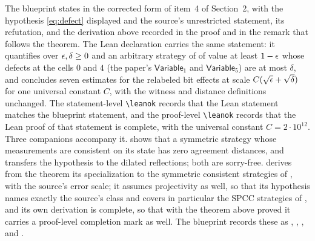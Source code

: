 \documentclass[11pt]{article}
\newcommand{\Variable}{\mathsf{Variable}}
\begin{document}
The blueprint \cite{MIPStarREBlueprint} states  in the
corrected form of item~4 of Section~2, with the hypothesis \eqref{eq:defect}
displayed and the source's unrestricted statement, its refutation, and the
derivation above recorded in the proof and in the remark that follows the
theorem.  The Lean declaration 
carries the same statement: it quantifies over $\epsilon, \delta \ge 0$ and an
arbitrary strategy of  of value at least
$1-\epsilon$ whose defects  at
the cells $0$ and $4$ (the paper's $\Variable_1$ and $\Variable_5$) are at most
$\delta$, and concludes seven estimates for the relabeled bit effects at scale
$C(\sqrt{\epsilon} + \sqrt\delta)$ for one universal constant $C$, with the witness
and distance definitions unchanged.  The statement-level \verb|\leanok| records
that the Lean statement matches the blueprint statement, and the proof-level
\verb|\leanok| records that the Lean proof of that statement is complete, with
the universal constant $C = 2 \cdot 10^{12}$.  Three companions accompany it.
shows that a symmetric strategy whose measurements are consistent on its state
has zero agreement distances, and
transfers the hypothesis to the dilated reflections; both are sorry-free.
 derives
from the theorem its specialization to the symmetric consistent strategies of
, with the source's error scale; it
assumes projectivity as well, so that its hypothesis names exactly the source's
class and covers in particular the SPCC strategies of , and its
own derivation is complete, so that with the theorem above proved it carries a
proof-level completion mark as well.  The blueprint records these as
, ,
,  and
.
\end{document}
